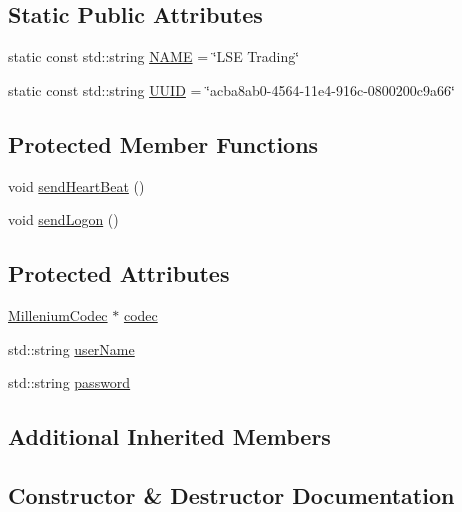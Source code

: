 \subsection*{Static Public Attributes}
\begin{DoxyCompactItemize}
\item 
static const std\+::string \hyperlink{classMetal_1_1LSE_1_1MilleniumAdapter_a605b1fe02491549ae9ad643db57335bd}{N\+A\+M\+E} = \char`\"{}L\+S\+E Trading\char`\"{}
\item 
static const std\+::string \hyperlink{classMetal_1_1LSE_1_1MilleniumAdapter_a5d93beb732517c12013a007611377341}{U\+U\+I\+D} = \char`\"{}acba8ab0-\/4564-\/11e4-\/916c-\/0800200c9a66\char`\"{}
\end{DoxyCompactItemize}
\subsection*{Protected Member Functions}
\begin{DoxyCompactItemize}
\item 
void \hyperlink{classMetal_1_1LSE_1_1MilleniumAdapter_a9b097537db390f3d552fd4ecbff5ab6f}{send\+Heart\+Beat} ()
\item 
void \hyperlink{classMetal_1_1LSE_1_1MilleniumAdapter_ab4bba2e8403ae7ed5b335985b4295b9f}{send\+Logon} ()
\end{DoxyCompactItemize}
\subsection*{Protected Attributes}
\begin{DoxyCompactItemize}
\item 
\hyperlink{classMetal_1_1LSE_1_1MilleniumCodec}{Millenium\+Codec} $\ast$ \hyperlink{classMetal_1_1LSE_1_1MilleniumAdapter_a09725d05caee94db4f4768ab73ebdafa}{codec}
\item 
std\+::string \hyperlink{classMetal_1_1LSE_1_1MilleniumAdapter_a1c12122da30ec79f3907a82ac1847c33}{user\+Name}
\item 
std\+::string \hyperlink{classMetal_1_1LSE_1_1MilleniumAdapter_aa8120f11aac5d4825a5766d86e53e5a2}{password}
\end{DoxyCompactItemize}
\subsection*{Additional Inherited Members}


\subsection{Constructor \& Destructor Documentation}
\hypertarget{classMetal_1_1LSE_1_1MilleniumAdapter_abc4133dd6d89a8271d4c64eb46d365c1}{}
